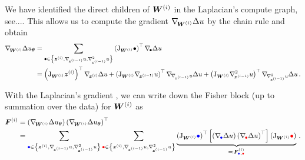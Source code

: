 We have identified the direct children of ${\bm{W}}^{(i)}$ in the Laplacian's compute graph, see....
This allows us to compute the gradient $\nabla_{\!{{\bm{W}}^{(i)}}} \Delta u$ by the chain rule and obtain %
\begin{align}\label{eq:laplacian-gradient}
  \begin{split}
    \grad{\mW^{(i)}} \Delta u_{\vtheta}
    &=
      \sum_{\bullet \in \left\{ \vz^{(i)}, \grad{\vz^{(i-1)}}u, \gradsquared{\vz^{(i-1)}}u \right\}}
      \left(
      \jac_{\mW^{(i)}}\bullet
      \right)^{\top}
      \grad{\bullet}\Delta u
    \\
    &=
      \left(
      \jac_{\mW^{(i)}}\vz^{(i)}
      \right)^{\top}
      \grad{\vz^{(i)}}\Delta u
      +
      \left(
      \jac_{\mW^{(i)}}\grad{\vz^{(i-1)}}u
      \right)^{\top}
      \grad{\grad{\vz^{(i-1)}}u}\Delta u
      +
      \left(
      \jac_{\mW^{(i)}}\gradsquared{\vz^{(i-1)}}u
      \right)^{\top}
      \grad{\gradsquared{\vz^{(i-1)}}u}\Delta u\,.
  \end{split}
\end{align}

With the Laplacian's gradient , we can write down the Fisher block (up to summation over the data) for ${\bm{W}}^{(i)}$ as
\begin{align}\label{eq:fisher}
  \begin{split}
    \mF^{(i)}
    &=
      \left(
      \grad{\mW^{(i)}} \Delta u_{\vtheta}
      \right)
      \left(
      \grad{\mW^{(i)}} \Delta u_{\vtheta}
      \right)^{\top}
    \\
    &=
      \sum_{\textcolor{blue}{\bullet} \in \left\{ \vz^{(i)}, \grad{\vz^{(i-1)}}u, \gradsquared{\vz^{(i-1)}}u \right\}}
      \sum_{\textcolor{red}{\bullet} \in \left\{ \vz^{(i)}, \grad{\vz^{(i-1)}}u, \gradsquared{\vz^{(i-1)}}u \right\}}
      \underbrace{
      \left(
      \jac_{\mW^{(i)}}\textcolor{blue}{\bullet}
      \right)^{\top}
      \left[
      \left(
      \grad{\textcolor{blue}{\bullet}}\Delta u
      \right)
      \left(
      \grad{\textcolor{red}{\bullet}}\Delta u
      \right)^{\top}
      \right]
      \left(
      \jac_{\mW^{(i)}}\textcolor{red}{\bullet}
      \right)}_{
      \eqqcolon \mF^{(i)}_{\textcolor{blue}{\bullet}, \textcolor{red}{\bullet}}
      }\,.
  \end{split}
\end{align}

